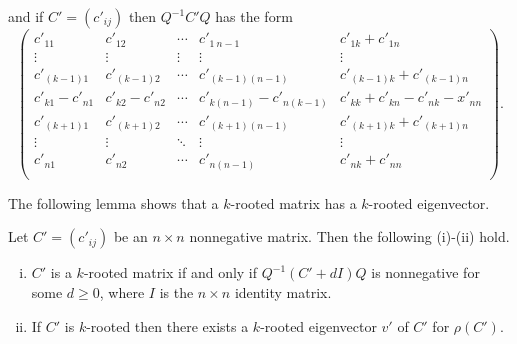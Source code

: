 \documentclass{beamer}
\begin{document}
\begin{frame}
    and if $C'=(c'_{ij})$ then $Q^{-1}C'Q$ has the form 
\begin{equation}\label{e6}
\begin{pmatrix}
            c'_{11}     & c'_{12} & \cdots     & c'_{1\ n-1} & c'_{1k}+c'_{1n} \\
            \vdots      & \vdots  & \vdots     & \vdots      & \vdots\\
            c'_{(k-1) 1}   & c'_{(k-1)  2}           & \cdots     & c'_{(k-1) (n-1)} & c'_{(k-1) k}+c'_{(k-1) n} \\
            c'_{k1}-c'_{n1} & c'_{k2}-c'_{n2} &\cdots      &c'_{k (n-1)}-c'_{n (k-1)}& c'_{kk}+c'_{kn}-c'_{nk}-x'_{nn}\\
            c'_{(k+1) 1}   & c'_{(k+1) 2}           & \cdots     & c'_{(k+1) (n-1)} & c'_{(k+1) k}+c'_{(k+1)
             n} \\
            \vdots              & \vdots & \ddots              & \vdots & \vdots \\
            c'_{n1}     & c'_{n2} & \cdots             & c'_{n (n-1)} & c'_{nk}+c'_{nn} \\
        \end{pmatrix}.\end{equation}

\end{frame}

\begin{frame}
    The following lemma shows that a $k$-rooted matrix has a $k$-rooted eigenvector.


\begin{lemma}\label{lma_m_rooted}
    Let $C'=(c'_{ij})$ be an $n\times n$ nonnegative matrix. Then the following (i)-(ii) hold.
        \begin{enumerate}[(i)]
            \item \label{lma_m_rooted_cond1} $C'$ is a $k$-rooted matrix if and only if $Q^{-1}(C'+dI)Q$ is nonnegative for some $d\geq 0$, where $I$ is the $n\times n$ identity matrix. 
            \item \label{lma_m_rooted_cond2} If $C'$ is $k$-rooted then there exists a  $k$-rooted eigenvector $v'$ of $C'$  for $\rho(C')$.
        \end{enumerate}
\end{lemma}
\end{frame}
\end{document}
